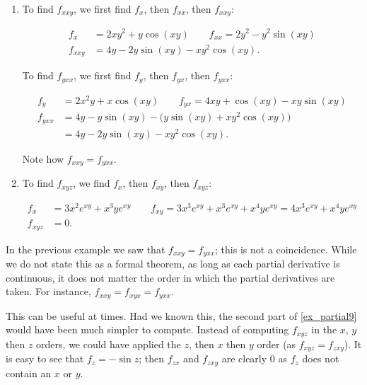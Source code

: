 {\begin{enumerate}
	\item To find $f_{xxy}$, we first find $f_x$, then $f_{xx}$, then $f_{xxy}$:
	
	\begin{align*}
	f_x &= 2xy^2+y\cos(xy) \quad\quad f_{xx} = 2y^2-y^2\sin(xy)\\
	f_{xxy} &= 4y-2y\sin(xy) - xy^2\cos(xy).
	\end{align*}
	
	To find $f_{yxx}$, we first find $f_y$, then $f_{yx}$, then $f_{yxx}$:
	
	\begin{align*}
	f_y &= 2x^2y+x\cos(xy) \quad \quad f_{yx} = 4xy + \cos(xy) - xy\sin(xy)\\
	f_{yxx} &= 4y-y\sin(xy) - \big(y\sin(xy) + xy^2\cos(xy)\big)\\ &= 4y-2y\sin(xy)-xy^2\cos(xy).
	\end{align*}
	
	Note how $f_{xxy} = f_{yxx}$.
	
	\item		To find $f_{xyz}$, we find $f_x$, then $f_{xy}$, then $f_{xyz}$:
	
	\begin{align*}
	f_x &= 3x^2e^{xy}+ x^3ye^{xy} \quad \quad f_{xy} = 3x^3e^{xy}+x^3e^{xy}+x^4ye^{xy} = 4x^3e^{xy}+x^4ye^{xy}\\
	f_{xyz} &= 0.
	\end{align*}
\end{enumerate}}

In the previous example we saw that $f_{xxy} = f_{yxx}$; this is not a coincidence. While we do not state this as a formal theorem, as long as each partial derivative is continuous, it does not matter the order in which the partial derivatives are taken. For instance, $f_{xxy} = f_{xyx} = f_{yxx}$. 

This can be useful at times. Had we known this, the second part of \autoref{ex_partial9} would have been much simpler to compute. Instead of computing $f_{xyz}$ in the $x$, $y$ then $z$ orders, we could have applied the $z$, then $x$ then $y$ order (as $f_{xyz} = f_{zxy}$). It is easy to see that $f_z = -\sin z$; then $f_{zx}$ and $f_{zxy}$ are clearly 0 as $f_z$ does not contain an $x$ or $y$.\\

